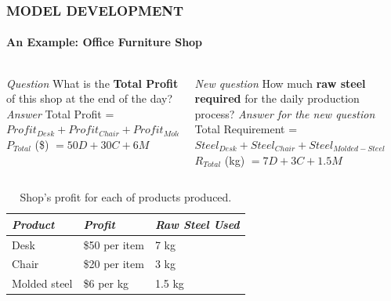 \documentclass[14 pt]{beamer}
\begin{document}
\begin{frame}[t]
\frametitle{MODEL DEVELOPMENT}
\framesubtitle{An Example: Office Furniture Shop}

\begin{columns}[t]
\begin{column}{0.45\textwidth}
\emph{Question}
\vskip0.5cm%
What is the \textbf{Total Profit} of this shop at the end of the day?
\vskip0.5cm%
\emph{Answer}
\vskip0.5cm%
Total Profit = $Profit_{Desk}+Profit_{Chair}+Profit_{Molded-Steel}$
\vskip0.5cm%
$P_{Total}$ (\$) $=50D+30C+6M$
\end{column}
\begin{column}{0.45\textwidth}
\emph{New question}
\vskip0.5cm%
How much \textbf{raw steel required} for the daily production process?
\vskip0.5cm%
\emph{Answer for the new question}
\vskip0.5cm%
Total Requirement = $Steel_{Desk}+Steel_{Chair}+Steel_{Molded-Steel}$
\vskip0.5cm%
$R_{Total}$ (kg) $=7D+3C+1.5M$
\end{column}
\end{columns}
\vskip1.5cm%
\begin{table}
\begin{tabular}{p{4cm}p{4cm}p{4cm}}
  \hline
  \emph{Product} & \emph{Profit} & \emph{Raw Steel Used} \\
  \hline
  Desk  & \$50 per item & 7 kg \\
  Chair & \$20 per item & 3 kg\\
  Molded steel & \$6 per kg & 1.5 kg\\
  \hline
\end{tabular}
\caption{Shop's profit for each of products produced.}
\end{table}

\end{frame}

\end{document}
